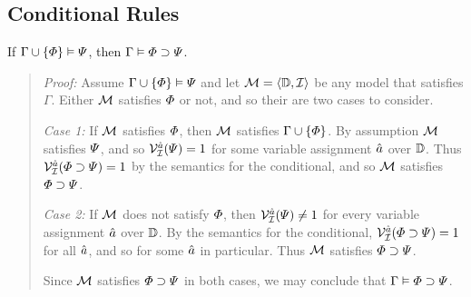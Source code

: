\subsection{Conditional Rules}%
  \label{sub:ConditionalRules}
  
\begin{Lthm} \label{lemma:cond}
  If $\Gamma \cup \lbrace\varPhi\rbrace \vDash \varPsi$, then $\Gamma \vDash \varPhi \supset \varPsi$.
\end{Lthm}

\begin{quote} 
  \textit{Proof:} Assume $\Gamma \cup \lbrace\varPhi\rbrace \vDash \varPsi$ and let $\mathcal{M}=\langle\mathbb{D},\mathcal{I}\rangle$ be any model that satisfies $\Gamma$.
  Either $\mathcal{M}$ satisfies $\varPhi$ or not, and so their are two cases to consider. 

  \textit{Case 1:}
  If $\mathcal{M}$ satisfies $\varPhi$, then $\mathcal{M}$ satisfies $\Gamma \cup \lbrace\varPhi\rbrace$.
  By assumption $\mathcal{M}$ satisfies $\varPsi$, and so $\mathcal{V}_{\mathcal{I}}^{\hat{a}}(\varPsi)=1$ for some variable assignment $\hat{a}$ over $\mathbb{D}$.
  Thus $\mathcal{V}_{\mathcal{I}}^{\hat{a}}(\varPhi \supset \varPsi)=1$ by the semantics for the conditional, and so $\mathcal{M}$ satisfies $\varPhi \supset \varPsi$.

  \textit{Case 2:}
  If $\mathcal{M}$ does not satisfy $\varPhi$, then $\mathcal{V}_{\mathcal{I}}^{\hat{a}}(\varPsi)\neq 1$ for every variable assignment $\hat{a}$ over $\mathbb{D}$. 
  By the semantics for the conditional, $\mathcal{V}_{\mathcal{I}}^{\hat{a}}(\varPhi \supset \varPsi)=1$ for all $\hat{a}$, and so for some $\hat{a}$ in particular.
  Thus $\mathcal{M}$ satisfies $\varPhi \supset \varPsi$.

  Since $\mathcal{M}$ satisfies $\varPhi \supset \varPsi$ in both cases, we may conclude that $\Gamma \vDash \varPhi \supset \varPsi$. 
\end{quote}






\label{rule:CondI}


